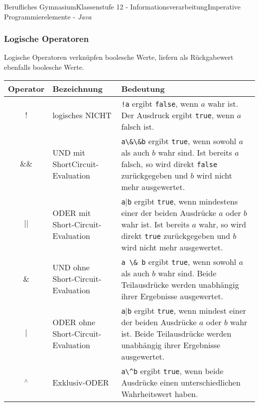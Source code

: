 \documentclass[oneside,openany,headings=optiontotoc,11pt,numbers=noenddot]{article}
\begin{document}
\begin{worksheet}{Berufliches Gymnasium}{Klassenstufe 12 - Informationsverarbeitung}{Imperative Programmierelemente - \textit{Java}}
		\subsubsection{Logische Operatoren}
		Logische Operatoren verknüpfen boolesche Werte, liefern als Rückgabewert ebenfalls boolesche Werte.\\
		\par\noindent
		\begin{tabularx}{\textwidth}{|c|l|X|}
			\hline
			\textbf{Operator} & \textbf{Bezeichnung} & \textbf{Bedeutung}\\
			\hline
			\(!\) & logisches NICHT & {\lstinline[style=JavaInputStyle]|!a|} ergibt {\lstinline[style=JavaInputStyle]|false|}, wenn \(a\) wahr ist. Der Ausdruck ergibt {\lstinline[style=JavaInputStyle]|true|}, wenn \(a\) falsch ist.\\
			\hline
			\(\&\&\) & UND \tiny{mit ShortCircuit-Evaluation}\normalsize & {\lstinline[style=JavaInputStyle]|a\&\&b|} ergibt {\lstinline[style=JavaInputStyle]|true|}, wenn sowohl \(a\) als auch \(b\) wahr sind. Ist bereits \(a\) falsch, so wird direkt {\lstinline[style=JavaInputStyle]|false|} zurückgegeben und \(b\) wird nicht mehr ausgewertet.\\
			\hline
			\(||\) & ODER \tiny{mit Short-Circuit-Evaluation}\normalsize & {\lstinline[style=JavaInputStyle]|a||\lstinline[style=JavaInputStyle]|b|} ergibt {\lstinline[style=JavaInputStyle]|true|}, wenn mindestens einer der beiden Ausdrücke \(a\) oder \(b\) wahr ist. Ist bereits \(a\) wahr, so wird direkt {\lstinline[style=JavaInputStyle]|true|} zurückgegeben und \(b\) wird nicht mehr ausgewertet.\\
			\hline
			\(\&\) & UND \tiny{ohne Short-Circuit-Evaluation}\normalsize & {\lstinline[style=JavaInputStyle]|a \& b|} ergibt {\lstinline[style=JavaInputStyle]|true|}, wenn sowohl \( a\) als auch \(b\) wahr sind. Beide Teilausdrücke werden unabhängig ihrer Ergebnisse ausgewertet.\\
			\hline
			\(|\) & ODER \tiny{ohne Short-Circuit-Evaluation}\normalsize & {\lstinline[style=JavaInputStyle]|a||\lstinline[style=JavaInputStyle]|b|} ergibt {\lstinline[style=JavaInputStyle]|true|}, wenn mindest einer der beiden Ausdrücke \(a\) oder \(b\) wahr ist. Beide Teilausdrücke werden unabhängig ihrer Ergebnisse ausgewertet.\\
			\hline
			\(^{\wedge}\) & Exklusiv-ODER & {\lstinline[style=JavaInputStyle]|a\^b|} ergibt {\lstinline[style=JavaInputStyle]|true|}, wenn beide Ausdrücke einen unterschiedlichen Wahrheitswert haben.\\
			\hline
		\end{tabularx}

\end{worksheet}
\end{document}
